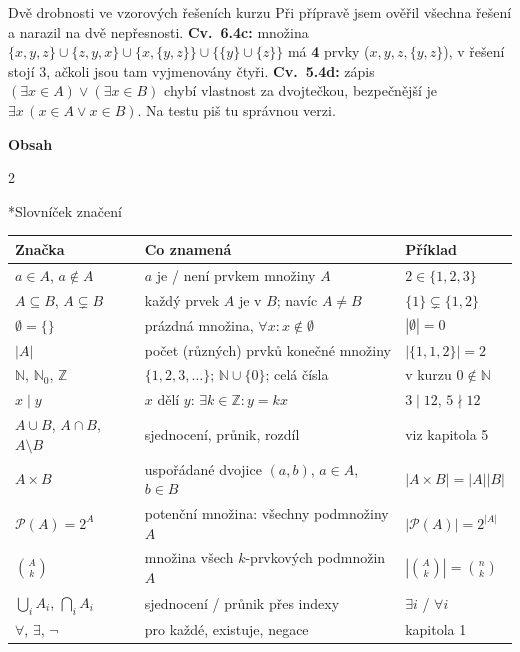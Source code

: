 \documentclass[10pt,a4paper]{article}
\makeatletter
\newcommand{\N}{\mathbb N}
\newcommand{\Z}{\mathbb Z}
\newcommand{\pr}{\mathrel{\mid}}
\newcommand{\nepr}{\mathrel{\nmid}}
\newcommand{\sm}{\setminus}
\renewcommand{\subsection}{\Needspace{7\baselineskip}\@startsection{subsection}{2}{0pt}{2.2ex plus .3ex minus .1ex}{0.8ex}{\sffamily\bfseries\large\color{accent}}}
\makeatother
\begin{document}
\begin{past}{Dvě drobnosti ve vzorových řešeních kurzu}
Při přípravě jsem ověřil všechna řešení a narazil na dvě nepřesnosti. \textbf{Cv.\ 6.4c:} množina $\{x,y,z\}\cup\{z,y,x\}\cup\{x,\{y,z\}\}\cup\{\{y\}\cup\{z\}\}$ má \textbf{4} prvky ($x,y,z,\{y,z\}$), v řešení stojí 3, ačkoli jsou tam vyjmenovány čtyři. \textbf{Cv.\ 5.4d:} zápis $(\exists x\in A)\lor(\exists x\in B)$ chybí vlastnost za dvojtečkou, bezpečnější je $\exists x\,(x\in A\lor x\in B)$. Na testu piš tu správnou verzi.
\end{past}

\vspace{4pt}
{\sffamily\bfseries\Large\color{accent} Obsah}\par\vspace{2pt}
\begin{multicols}{2}
\small
\setcounter{tocdepth}{2}
\renewcommand{\contentsname}{}
\tableofcontents
\end{multicols}

\subsection*{Slovníček značení}
\small
\begin{tabular}{@{}p{3.6cm}p{8.2cm}p{4.2cm}@{}}
\textbf{Značka} & \textbf{Co znamená} & \textbf{Příklad}\\\midrule
$a\in A$, $a\notin A$ & $a$ je / není prvkem množiny $A$ & $2\in\{1,2,3\}$\\
$A\subseteq B$, $A\subsetneq B$ & každý prvek $A$ je v $B$; navíc $A\neq B$ & $\{1\}\subsetneq\{1,2\}$\\
$\emptyset=\{\}$ & prázdná množina, $\forall x: x\notin\emptyset$ & $|\emptyset|=0$\\
$|A|$ & počet (různých) prvků konečné množiny & $|\{1,1,2\}|=2$\\
$\N$, $\N_0$, $\Z$ & $\{1,2,3,\dots\}$; $\N\cup\{0\}$; celá čísla & v kurzu $0\notin\N$\\
$x\pr y$ & $x$ dělí $y$: $\exists k\in\Z: y=kx$ & $3\pr 12$, $5\nepr 12$\\
$A\cup B$, $A\cap B$, $A\sm B$ & sjednocení, průnik, rozdíl & viz kapitola 5\\
$A\times B$ & uspořádané dvojice $(a,b)$, $a\in A$, $b\in B$ & $|A\times B|=|A||B|$\\
$\mathcal P(A)=2^A$ & potenční množina: všechny podmnožiny $A$ & $|\mathcal P(A)|=2^{|A|}$\\
$\binom{A}{k}$ & množina všech $k$-prvkových podmnožin $A$ & $\left|\binom{A}{k}\right|=\binom nk$\\
$\bigcup_{i}A_i$, $\bigcap_{i}A_i$ & sjednocení / průnik přes indexy & $\exists i$ / $\forall i$\\
$\forall$, $\exists$, $\neg$ & pro každé, existuje, negace & kapitola 1\\
\end{tabular}
\normalsize
\end{document}
